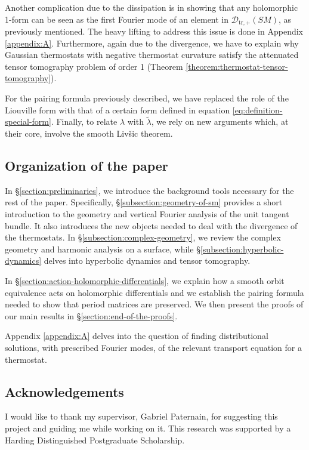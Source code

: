 \documentclass[reqno,12pt,letterpaper]{amsart}
\theoremstyle{definition}
\theoremstyle{remark}
\theoremstyle{definition}
\numberwithin{equation}{section}
\begin{document}
 Another complication due to the dissipation is in showing that any holomorphic 1-form can be seen as the first Fourier mode of an element in $\mathcal{D}_{\text{tr}, +}(SM)$, as previously mentioned. The heavy lifting to address this issue is done in Appendix \ref{appendix:A}. Furthermore, again due to the divergence, we have to explain why Gaussian thermostats with negative thermostat curvature satisfy the attenuated tensor tomography problem of order 1 (Theorem \ref{theorem:thermostat-tensor-tomography}).
 
For the pairing formula previously described, we have replaced the role of the Liouville form with that of a certain form defined in equation  \eqref{eq:definition-special-form}. Finally, to relate $\lambda$ with $\tilde{\lambda}$, we rely on new arguments which, at their core, involve the smooth Livšic theorem.

\subsection{Organization of the paper} 
In  \S\ref{section:preliminaries}, we introduce the background tools necessary for the rest of the paper. Specifically, \S\ref{subsection:geometry-of-sm} provides a short introduction to the geometry and vertical Fourier analysis of the unit tangent bundle. It also introduces the new objects needed to deal with the divergence of the thermostats. In \S\ref{subsection:complex-geometry}, we review the complex geometry and harmonic analysis on a surface, while \S\ref{subsection:hyperbolic-dynamics} delves into hyperbolic dynamics and tensor tomography. 

In \S\ref{section:action-holomorphic-differentials}, we explain how a smooth orbit equivalence acts on holomorphic differentials and we establish the pairing formula needed to show that period matrices are preserved. We then present the proofs of our main results in \S\ref{section:end-of-the-proofs}. 

Appendix \ref{appendix:A} delves into the question of finding distributional solutions, with prescribed Fourier modes, of the relevant transport equation for a thermostat.

\subsection*{Acknowledgements} I would like to thank my supervisor, Gabriel Paternain, for suggesting this project and guiding me while working on it. This research was supported by a Harding Distinguished Postgraduate Scholarship.
\end{document}
